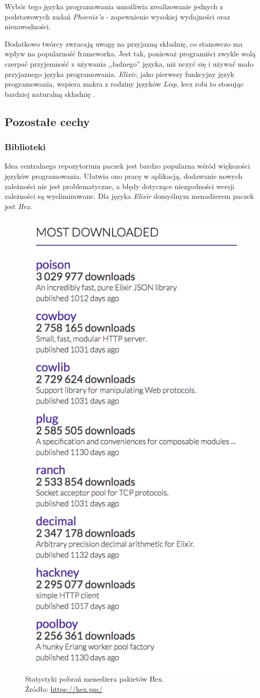 Wybór tego języka programowania umożliwia zrealizowanie jednych z podstawowych zadań \textit{Phoenix'a} - zapewnienie wysokiej wydajności oraz niezawodności.

Dodatkowo twórcy zwracają uwagę na przyjazną składnię, co stanowczo ma wpływ na popularność frameworka. Jest tak, ponieważ programiści zwykle wolą czerpać przyjemność z używania ,,ładnego'' języka, niż uczyć się i używać mało przyjaznego języka programowania. \textit{Elixir}, jako pierwszy funkcyjny język programowania, wspiera makra z rodziny języków \textit{Lisp}, lecz robi to stosując bardziej naturalną składnię \cite{phoenix_doctrine}.

\subsection{Pozostałe cechy}
\subsubsection{Biblioteki}
Idea centralnego repozytorium paczek jest bardzo popularna wśród większości języków programowania. Ułatwia ono pracę w aplikacją, dodawanie nowych zależności nie jest problematyczne, a błędy dotyczące niezgodności wersji zależności są wyeliminowane. Dla języka \textit{Elixir} domyślnym menadżerem paczek jest \textit{Hex}.

\begin{figure}[h]
  \centering
  \includegraphics[width=.4\linewidth]{images/hex_stats}
  \caption{Statystyki pobrań menedżera pakietów Hex.\\Źródło: \url{https://hex.pm/}}
  \label{fig:hex_stats}
\end{figure}

